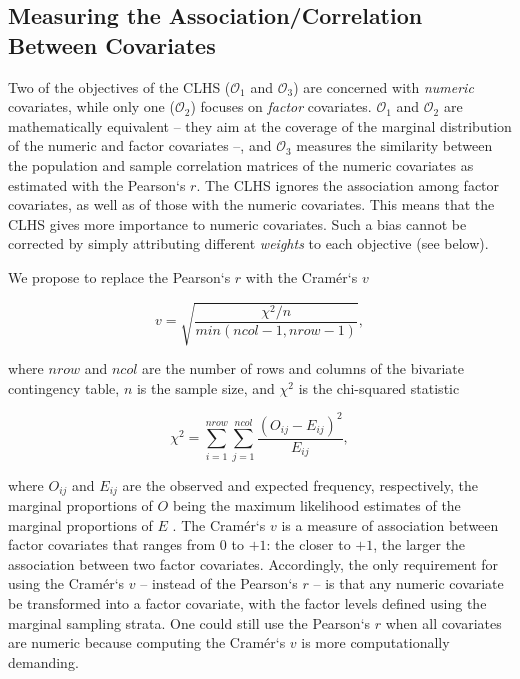\subsection{Measuring the Association/Correlation Between Covariates}

Two of the objectives of the CLHS ($\mathcal{O}_1$ and $\mathcal{O}_3$) are concerned with \emph{numeric} 
covariates, while only one ($\mathcal{O}_2$) focuses on \emph{factor} covariates. $\mathcal{O}_1$ and 
$\mathcal{O}_2$ are mathematically equivalent -- they aim at the coverage of the marginal distribution of the 
numeric and factor covariates --, and $\mathcal{O}_3$ measures the similarity between the population and 
sample correlation matrices of the numeric covariates as estimated with the Pearson`s $r$. The CLHS ignores 
the association among factor covariates, as well as of those with the numeric covariates. This means that the 
CLHS gives more importance to numeric covariates. Such a bias cannot be corrected by simply attributing 
different \emph{weights} to each objective (see below).

We propose to replace the Pearson`s $r$ with the Cramér`s $v$

\begin{equation}
 v =  \sqrt{\frac{\chi^2 / n}{min(ncol - 1, nrow - 1)}},
\end{equation}\label{eq:chap07-cramer}

\noindent where $nrow$ and $ncol$ are the number of rows and columns of the bivariate contingency table, 
$n$ is the sample size, and $\chi^2$ is the chi-squared statistic

\begin{equation}
 \chi^2 = \sum_{i = 1}^{nrow}\sum_{j=1}^{ncol}\frac{(O_{ij} - E_{ij})^2}{E_{ij}},
\end{equation}\label{eq:chap07-chi-squared}

\noindent where $O_{ij}$ and $E_{ij}$ are the observed and expected frequency, respectively, the marginal 
proportions of $O$ being the maximum likelihood estimates of the marginal proportions of $E$ 
\cite{Cramer1946, Agresti2002}. The Cramér`s $v$ is a measure of association between factor covariates that 
ranges from $0$ to $+1$: the closer to $+1$, the larger the association between two factor covariates. 
Accordingly, the only requirement for using the Cramér`s $v$ -- instead of the Pearson`s $r$ -- is that any 
numeric covariate be transformed into a factor covariate, with the factor levels defined using the marginal 
sampling strata. One could still use the Pearson`s $r$ when all covariates are numeric because computing the 
Cramér`s $v$ is more computationally demanding.

